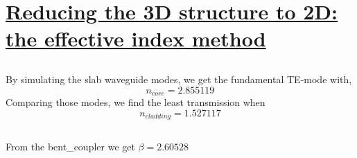 \documentclass[fontsize=11pt]{scrartcl}
\begin{document}
\section{\uline{Reducing the 3D structure to 2D: the effective index method}}
\subsection{}
By simulating the slab waveguide modes, we get the fundamental TE-mode with,
\begin{equation} 
    n_{core}=2.855119 
    \label{eq1}
\end{equation}
Comparing those modes, we find the least transmission when
\begin{equation} 
    n_{cladding}=1.527117 
    \label{eq2}
\end{equation}
\subsection{}
From the bent\_coupler we get $\beta=2.60528$
\end{document}
